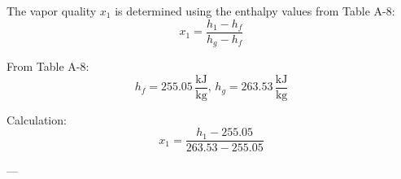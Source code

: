The vapor quality \( x_1 \) is determined using the enthalpy values from Table A-8:  
\[
x_1 = \frac{h_1 - h_f}{h_g - h_f}
\]  

From Table A-8:  
\[
h_f = 255.05 \, \frac{\text{kJ}}{\text{kg}}, \, h_g = 263.53 \, \frac{\text{kJ}}{\text{kg}}
\]  

Calculation:  
\[
x_1 = \frac{h_1 - 255.05}{263.53 - 255.05}
\]  

---